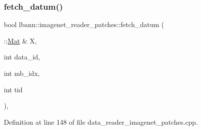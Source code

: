 \subsubsection{\texorpdfstring{fetch\+\_\+datum()}{fetch\_datum()}}
{\footnotesize\ttfamily bool lbann\+::imagenet\+\_\+reader\+\_\+patches\+::fetch\+\_\+datum (\begin{DoxyParamCaption}\item[{\+::\hyperlink{base_8hpp_a68f11fdc31b62516cb310831bbe54d73}{Mat} \&}]{X,  }\item[{int}]{data\+\_\+id,  }\item[{int}]{mb\+\_\+idx,  }\item[{int}]{tid }\end{DoxyParamCaption})\hspace{0.3cm}{\ttfamily [override]}, {\ttfamily [protected]}}



Definition at line 148 of file data\+\_\+reader\+\_\+imagenet\+\_\+patches.\+cpp.


